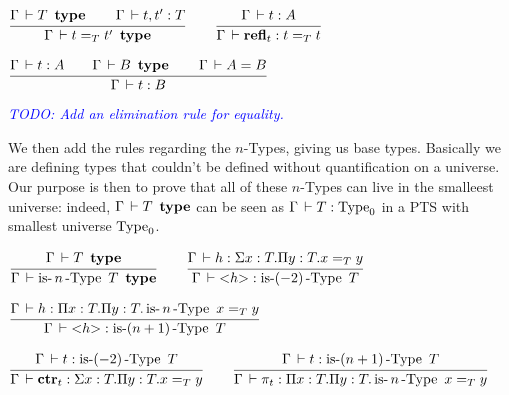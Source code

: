 \documentclass[a4paper,english]{lipics-utf8x}
\newcommand\meta[1]{\noindent\textcolor{blue}{\emph{#1}}}
\begin{document}
  \begin{center}
  \(
    \ru{\Gamma \der T \type \qquad
        \Gamma \der t,t' : T
      }{\Gamma \der t =_T t' \type}
    \qquad
    \ru{\Gamma \der t : A
      }{\Gamma \der \refl_t : t =_T t}
  \)
  \end{center}

  \begin{center}
  \(
    \ru{\Gamma \der t : A \qquad
        \Gamma \der B \type \qquad
        \Gamma \der A = B
      }{\Gamma \der t : B}
  \)
  \end{center}

  \meta{TODO: Add an elimination rule for equality.}

  \noindent %
  We then add the rules regarding the $n$-Types, giving us base
  types.
  Basically we are defining types that couldn't be defined without
  quantification on a universe. Our purpose is then to prove
  that all of these $n$-Types can live in the smalleest universe:
  indeed, $\Gamma \,\vdash T \operatorname{\ \mathbf{type}}$ can be seen as
  $\Gamma \,\vdash T : \operatorname{Type}_0$ in a PTS with smallest universe
  $\operatorname{Type}_0$.

  \begin{center}
  \(
    \ru{\Gamma \der T \type
      }{\Gamma \der \isnType{n}{T} \type}
    \qquad
    \ru{%
        \Gamma \der h : \Sigma x:T. \Pi y:T. x =_T y
      }{\Gamma \der {<} h {>} : \isnType{(-2)}{T}}
  \)
  \end{center}

  \begin{center}
  \(
    \ru{%
        \Gamma \der h : \Pi x:T. \Pi y:T. \isnType{n}{x =_T y}
      }{\Gamma \der {<} h {>} : \isnType{(n+1)}{T}}
  \)
  \end{center}

  \begin{center}
  \(
    \ru{\Gamma \der t : \isnType{(-2)}{T}
      }{\Gamma \der \ctr_t : \Sigma x:T. \Pi y:T. x =_T y}
    \qquad
    \ru{\Gamma \der t : \isnType{(n+1)}{T}
      }{\Gamma \der \pi_t : \Pi x:T. \Pi y:T. \isnType{n}{x =_T y}}
  \)
  \end{center}


%
%
\end{document}

